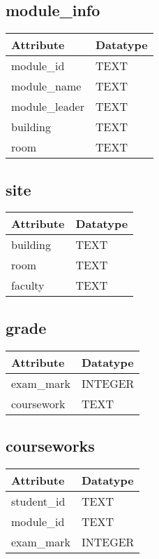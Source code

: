 \documentclass[12pt]{article}
\begin{document}
{{\subsection*{\centering module\_info}
\begin{longtable}{|l|l|}
\hline
\textbf{Attribute} & \textbf{Datatype} \\ \hline
module\_id          & TEXT    \\ \hline
module\_name        & TEXT                 \\ \hline
module\_leader      & TEXT                 \\ \hline
building            & TEXT                 \\ \hline
room                & TEXT                 \\ \hline
\end{longtable}

\subsection*{\centering site}
\begin{longtable}{|l|l|}
\hline
\textbf{Attribute} & \textbf{Datatype} \\ \hline
building            & TEXT                 \\ \hline
room                & TEXT                 \\ \hline
faculty             & TEXT                 \\ \hline
\end{longtable}

\subsection*{\centering grade}
\begin{longtable}{|l|l|}
\hline
\textbf{Attribute} & \textbf{Datatype} \\ \hline
exam\_mark          & INTEGER    \\ \hline
coursework          & TEXT                 \\ \hline
\end{longtable}

\subsection*{\centering courseworks}
\begin{longtable}{|l|l|}
\hline
\textbf{Attribute} & \textbf{Datatype} \\ \hline
student\_id         & TEXT                 \\ \hline
module\_id          & TEXT                 \\ \hline
exam\_mark          & INTEGER                 \\ \hline
\end{longtable}

}}
\end{document}

